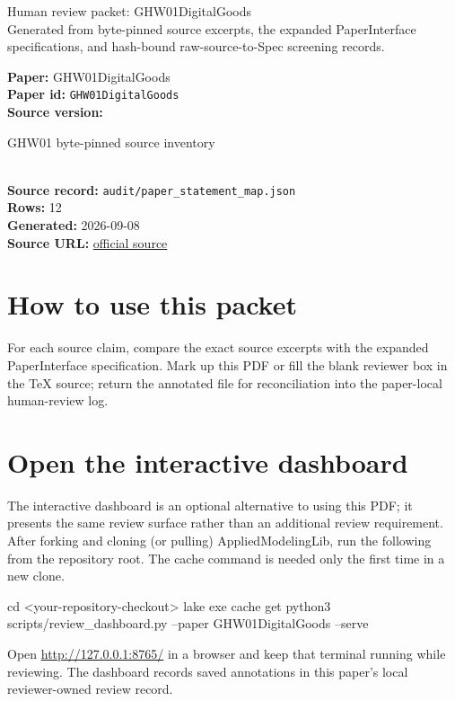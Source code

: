 \documentclass[10pt]{article}
\begin{document}
\fontsize{9}{10}\selectfont

\begin{center}
{\LARGE Human review packet: GHW01DigitalGoods}\\[0.35em]
\small Generated from byte-pinned source excerpts, the expanded PaperInterface
specifications, and hash-bound raw-source-to-Spec screening records.
\end{center}

\noindent\textbf{Paper:} GHW01DigitalGoods\\
\textbf{Paper id:} \texttt{GHW01DigitalGoods}\\
\textbf{Source version:} \parbox[t]{0.76\linewidth}{\raggedright GHW01 byte-pinned source inventory}\\
\textbf{Source record:} \texttt{audit/paper\_statement\_map.json}\\
\textbf{Rows:} 12\\
\textbf{Generated:} 2026-09-08\\
\textbf{Source URL:} \href{http://www.eecs.northwestern.edu/~hartline/papers/auctions-SODA-01.pdf}{official source}





\section*{How to use this packet}
For each source claim, compare the exact source excerpts with the expanded
PaperInterface specification. Mark up this PDF or fill the blank reviewer box in the TeX source;
return the annotated file for reconciliation into the paper-local human-review
log.

\section*{Open the interactive dashboard}
The interactive dashboard is an optional alternative to using this PDF; it
presents the same review surface rather than an additional review requirement.
After forking and cloning (or pulling) AppliedModelingLib, run the following from the
repository root. The cache command is needed only the first time in a new clone.
\begin{ReviewVerbatim}
cd <your-repository-checkout>
lake exe cache get
python3 scripts/review_dashboard.py --paper GHW01DigitalGoods --serve
\end{ReviewVerbatim}
Open \url{http://127.0.0.1:8765/} in a browser and keep that terminal running
while reviewing. The dashboard records saved annotations in this paper's local
reviewer-owned review record.
\end{document}
